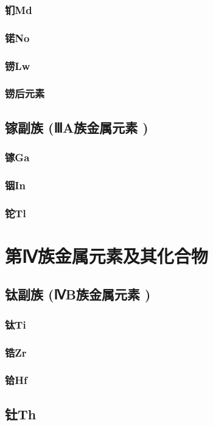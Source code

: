\documentclass[UTF8]{../03-Chemistry}
\begin{document}
        \subsubsection{钔Md}
        \subsubsection{锘No}
        \subsubsection{铹Lw}
        \subsubsection{铹后元素}
    \subsection{镓副族 (ⅢA族金属元素 )}
        \subsubsection{镓Ga}
        \subsubsection{铟In}
        \subsubsection{铊Tl}

\section{第Ⅳ族金属元素及其化合物}
    \subsection{钛副族 (ⅣB族金属元素 )}
        \subsubsection{钛Ti}
        \subsubsection{锆Zr}
        \subsubsection{铪Hf}
    \subsection{钍Th}
\end{document}
